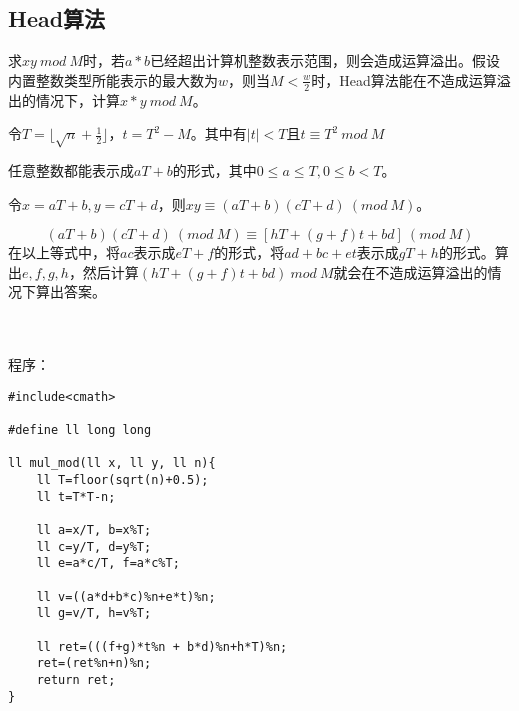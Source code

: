 \subsection{Head算法}

求$xy \ mod \ M$时，若$a*b$已经超出计算机整数表示范围，则会造成运算溢出。假设内置整数类型所能表示的最大数为$w$，则当$M<\frac{w}{2}$时，Head算法能在不造成运算溢出的情况下，计算$x*y\ mod \ M$。\par
令$T=\lfloor \sqrt n +\frac{1}{2} \rfloor$，$t=T^2-M$。其中有$|t|<T$且$t\equiv T^2\ mod \ M$ \par
任意整数都能表示成$aT+b$的形式，其中$0\leq a \leq T,0\leq b<T$。\par
令$x=aT+b,y=cT+d$，则$xy\equiv(aT+b)(cT+d)\ (mod\ M)$。 \par
$$(aT+b)(cT+d) \ (mod \  M) \equiv [hT+(g+f)t+bd] \ (mod \ M) $$
在以上等式中，将$ac$表示成$eT+f$的形式，将$ad+bc+et$表示成$gT+h$的形式。算出$e,f,g,h$，然后计算$(hT+(g+f)t+bd)\ mod \ M$就会在不造成运算溢出的情况下算出答案。\par
~\\
~\\
程序：\par
\begin{verbatim}
#include<cmath>

#define ll long long

ll mul_mod(ll x, ll y, ll n){
    ll T=floor(sqrt(n)+0.5);
    ll t=T*T-n;

    ll a=x/T, b=x%T;
    ll c=y/T, d=y%T;
    ll e=a*c/T, f=a*c%T;

    ll v=((a*d+b*c)%n+e*t)%n;
    ll g=v/T, h=v%T;

    ll ret=(((f+g)*t%n + b*d)%n+h*T)%n;
    ret=(ret%n+n)%n;
    return ret;
}

\end{verbatim}
